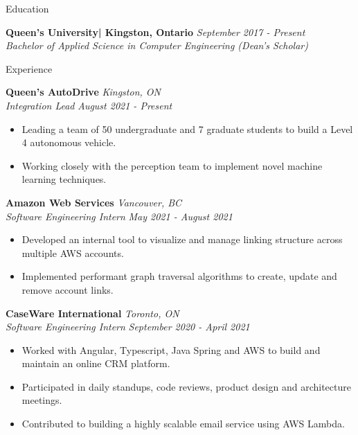 \documentclass{resume}
\begin{document}
	\begin{rSection}{Education}

		{\bf Queen's University| Kingston, Ontario} \hfill {\em September 2017 - Present} \\
		{\indent \textit{Bachelor of Applied Science in Computer Engineering (Dean's Scholar)}}

	\end{rSection}

	\begin{rSection}{Experience}

		{\bf Queen's AutoDrive} \hfill {\em Kingston, ON} \\
		{\indent \textit{ Integration Lead} \hfill {\em August 2021 - Present}}
		\vspace{-2mm}
		\begin{itemize}
			\setlength{\itemsep}{-8pt}
			\item Leading a team of 50 undergraduate and 7 graduate students to build a Level 4 autonomous vehicle.
			\item Working closely with the perception team to implement novel machine learning techniques.
		\end{itemize}

		{\bf Amazon Web Services} \hfill {\em Vancouver, BC} \\
		{\indent \textit{ Software Engineering Intern} \hfill {\em May 2021 - August 2021}}
		\vspace{-2mm}
		\begin{itemize}
		\setlength{\itemsep}{-8pt}
			\item Developed an internal tool to visualize and manage linking structure across multiple AWS accounts.
			\item Implemented performant graph traversal algorithms to create, update and remove account links.
		\end{itemize}

		{\bf CaseWare International} \hfill {\em Toronto, ON} \\
		{\indent \textit{ Software Engineering Intern} \hfill {\em September 2020 - April 2021}}
		\vspace{-2mm}
		\begin{itemize}
			\setlength{\itemsep}{-8pt}
			\item Worked with Angular, Typescript, Java Spring and AWS to build and maintain an online CRM platform.
			\item Participated in daily standups, code reviews, product design and architecture meetings. 
			\item Contributed to building a highly scalable email service using AWS Lambda.
		\end{itemize}


\end{rSection}
\end{document}
